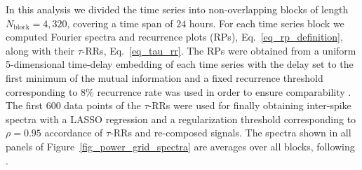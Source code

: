 \documentclass[entropy,article,submit,pdftex,moreauthors]{Definitions/mdpi}
\begin{document}
In this analysis we divided the time series into 
non-overlapping blocks of length $N_{\text{block}}=4,320$, covering a time span of $24$ hours. For each time series block we computed Fourier spectra and recurrence plots (RPs), 
Eq.~\eqref{eq_rp_definition}, along with their $\tau$-RRs, Eq.~\ref{eq_tau_rr}. The RPs were obtained from a uniform 5-dimensional time-delay embedding of each time series with 
the delay set to the first minimum of the mutual information \cite{fraser1986,hegger1999} and a fixed recurrence threshold corresponding to 8\% recurrence rate was used in order 
to ensure comparability \cite{kraemer2018}. The first $600$ data points of the $\tau$-RRs were used for finally obtaining inter-spike spectra with a LASSO regression and a 
regularization threshold corresponding to $\rho=0.95$ accordance of $\tau$-RRs and re-composed signals. The spectra shown in all panels of Figure~\ref{fig_power_grid_spectra} 
are averages over all blocks, following \citet{meyer2020identifying}.
\end{document}
